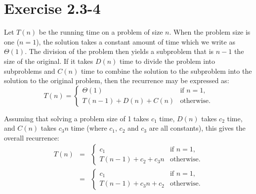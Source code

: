 \documentclass{article}
\begin{document}
\section*{Exercise 2.3-4}

Let $T(n)$ be the running time on a problem of size $n$. When the problem size is one ($n = 1$), the solution takes a constant amount of time which we write as $\Theta(1)$. The division of the problem then yields a subproblem that is $n - 1$ the size of the original. If it takes $D(n)$ time to divide the problem into subproblems and $C(n)$ time to combine the solution to the subproblem into the solution to the original problem, then the recurrence may be expressed as:
\begin{equation*}
	T(n) = \left\{
	       \begin{array}{ll}
		\Theta(1) & \text{if } n = 1, \\
		T(n - 1) + D(n) + C(n) & \text{otherwise}.
	\end{array} \right.
\end{equation*}

Assuming that solving a problem size of 1 takes $c_1$ time, $D(n)$ takes $c_2$ time, and $C(n)$ takes $c_3 n$ time (where $c_1$, $c_2$ and $c_3$ are all constants), this gives the overall recurrence:
\begin{eqnarray*}
	T(n) & = & \left\{
	       \begin{array}{ll}
		c_1 & \text{if } n = 1, \\
		T(n - 1) + c_2 + c_3 n & \text{otherwise}.
	\end{array} \right. \\
	 & = & \left\{
	       \begin{array}{ll}
		c_1 & \text{if } n = 1, \\
		T(n - 1) + c_3 n + c_2 & \text{otherwise}.
	\end{array} \right.
\end{eqnarray*}
\end{document}
